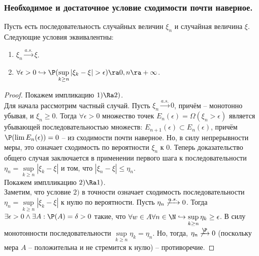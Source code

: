 \subsubsection{Необходимое и достаточное условие сходимости почти наверное.}
\begin{theorem}
    Пусть есть последовательность случайных величин $\xi_n$ и случайная величина $\xi$.
    Следующие условия эквивалентны:
    \begin{enumerate}
        \item $\xi_n \xrightarrow{a.s.} \xi$.
        \item $\forall \epsilon > 0 \hookrightarrow \P(\sup\limits_{k \geq n} |\xi_k - \xi| > \epsilon) \ra 0, n \ra +\infty$.
    \end{enumerate}
\end{theorem}
\begin{proof}
    Покажем импликацию $1) \Ra 2)$. \\
    Для начала рассмотрим частный случай. Пусть $\xi_n \xrightarrow{a.s.} 0$, причём -- монотонно убывая, и $\xi_n \geq 0$. Тогда $\forall \epsilon > 0$ множество точек $E_n(\epsilon) = \Omega(\xi_n > \epsilon)$ является убывающей последовательностью множеств: $E_{n + 1}(\epsilon) \subset E_{n}(\epsilon)$, причём $\P(\lim E_n(\epsilon)) = 0$ -- из сходимости почти наверное. Но, в силу непрерывности меры, это означает сходимость по вероятности $\xi_n$ к 0.
    Теперь доказательство общего случая заключается в применении первого шага к последовательности $\eta_n = \sup\limits_{k \geq n}|\xi_k - \xi|$ и том, что $|\xi_n - \xi| \leq \eta_n$. \\
    Покажем имплликацию $2) \Ra 1)$. \\
    Заметим, что условие $2)$ в точности означает сходимость последовательности $\eta_n = \sup\limits_{k \geq n}|\xi_k - \xi|$ к нулю по вероятности.
    Пусть $\eta_n \not\xrightarrow{a.s.} 0$.
    Тогда $\exists \epsilon > 0 \wedge \exists A: \P(A) = \delta > 0$ такие, что $\forall w \in A \forall n \in \N \hookrightarrow \sup\limits_{k \geq n} \eta_k \geq \epsilon$.
    В силу монотонности последовательности $\sup\limits_{k \geq n} \eta_k = \eta_n$.
    Но, тогда, $\eta_n \not\xrightarrow{\P} 0$ (поскольку мера $A$ -- положительна и не стремится к нулю) -- противоречие.
\end{proof}
